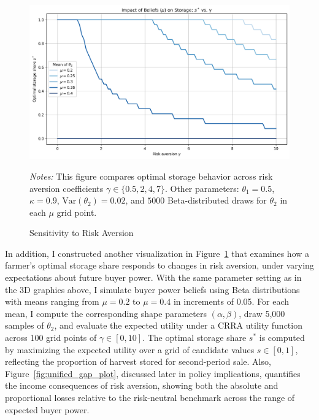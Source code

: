 \begin{figure}[ht!]
\centering
\includegraphics[width=\textwidth]{model_figures/sensitivity_to_gamma.png}
\caption{Sensitivity to Risk Aversion}
\label{Figure: sensitivity to risk aversion}
    \begin{tablenotes}[flushleft]
    \footnotesize
    \item \textit{Notes:} This figure compares optimal storage behavior across risk aversion coefficients $\gamma \in \{0.5, 2, 4, 7\}$. 
    Other parameters: $\theta_1=0.5$, $\kappa=0.9$, $\mathrm{Var}(\theta_2)=0.02$, and $5000$ Beta-distributed draws for $\theta_2$ in each $\mu$ grid point.
\end{tablenotes}
\end{figure}


In addition, I constructed another visualization in Figure~\ref{Figure: sensitivity to risk aversion} that examines how a farmer's optimal storage share responds to changes in risk aversion, under varying expectations about future buyer power. With the same parameter setting as in the 3D graphics above, I simulate buyer power beliefs using Beta distributions with means ranging from $\mu = 0.2$ to $\mu = 0.4$ in increments of 0.05. For each mean, I compute the corresponding shape parameters $(\alpha, \beta)$, draw 5,000 samples of $\theta_2$, and evaluate the expected utility under a CRRA utility function across 100 grid points of $\gamma \in [0, 10]$. The optimal storage share $s^*$ is computed by maximizing the expected utility over a grid of candidate values $s \in [0, 1]$, reflecting the proportion of harvest stored for second-period sale. Also, Figure~\ref{fig:unified_gap_plot}, discussed later in policy implications, quantifies the income consequences of risk aversion, showing both the absolute and proportional losses relative to the risk-neutral benchmark across the range of expected buyer power.




